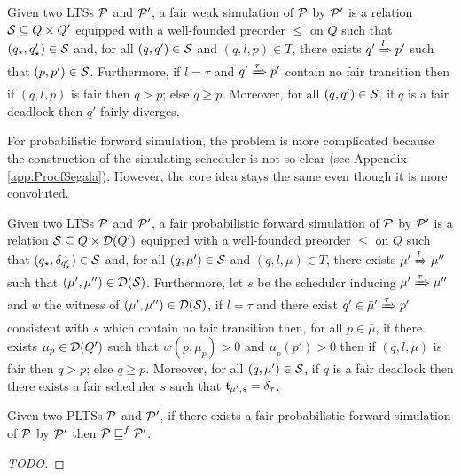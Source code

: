 \begin{definition}

    Given two LTSs $\mathcal{P}$ and $\mathcal{P}'$, a fair weak simulation of $\mathcal{P}$ by $\mathcal{P}'$ is a 
    relation $\mathcal{S} \subseteq Q \times Q'$ equipped with a well-founded preorder $\le$ on $Q$ such 
    that $(q_\star,q_\star') \in \mathcal{S}$ and, for all $(q,q') \in \mathcal{S}$ and $(q,l,p) \in T$, there 
    exists $q' \xRightarrow{l} p'$ such that $(p,p') \in \mathcal{S}$. Furthermore, if $l = \tau$ and 
    $q' \xRightarrow{\tau} p'$ contain no fair transition then if $(q,l,p)$ is fair then $q > p$; 
    else $q \ge p$. Moreover, for all $(q,q') \in \mathcal{S}$, if $q$ is a fair deadlock then $q'$ 
    fairly diverges.
\end{definition}

For probabilistic forward simulation, the problem is more complicated because the construction of
the simulating scheduler is not so clear (see Appendix \ref{app:ProofSegala}). However, the core
idea stays the same even though it is more convoluted.

\begin{definition}

    Given two LTSs $\mathcal{P}$ and $\mathcal{P}'$, a fair probabilistic forward simulation of $\mathcal{P}$ by 
    $\mathcal{P}'$ is a relation $\mathcal{S} \subseteq Q \times \mathcal{D}(Q')$ equipped with a well-founded 
    preorder $\le$ on $Q$ such that $(q_\star,\delta_{q_\star'}) \in \mathcal{S}$ and, for all $(q,\mu') 
    \in \mathcal{S}$ and $(q,l,\mu) \in T$, there exists $\mu' \xRightarrow{l} \mu''$ such that 
    $(\mu',\mu'') \in \mathcal{D}(\mathcal{S})$. Furthermore, let $s$ be the scheduler inducing $\mu' 
    \xRightarrow{\tau} \mu''$ and $w$ the witness of $(\mu',\mu'') \in \mathcal{D}(\mathcal{S})$, if $l = \tau$
    and there exist $q' \in \bar\mu' \xRightarrow{\tau} p'$ consistent with $s$ which contain no 
    fair transition then, for all $p \in \bar\mu$, if there exists $\mu_p \in \mathcal{D}(Q')$ such that
    $w(p,\mu_p) > 0$ and $\mu_p(p') > 0$ then if $(q,l,\mu)$ is fair then $q > p$; else $q \ge p$.
    Moreover, for all $(q,\mu') \in \mathcal{S}$, if $q$ is a fair deadlock then there exists a fair 
    scheduler $s$ such that $\mathfrak{t}_{\mu',s} = \delta_\tau$.
\end{definition}

\begin{theorem}
    \label{thm:Segalafair}
    Given two PLTSs $\mathcal{P}$ and $\mathcal{P}'$, if there exists a fair probabilistic forward simulation 
    of $\mathcal{P}$ by $\mathcal{P}'$ then $\mathcal{P} \sqsubseteq^f \mathcal{P}'$.
\end{theorem}
\begin{proof}
    [TODO]
\end{proof}

